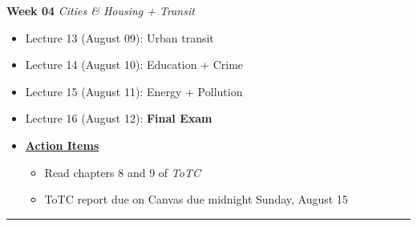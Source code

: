\documentclass[11pt]{article}
\begin{document}
		\textbf{Week 04} \textit{Cities \& Housing + Transit}
	\begin{itemize}
		\item Lecture 13 (August 09): Urban transit
		\item Lecture 14 (August 10): Education + Crime
		\item Lecture 15 (August 11): Energy + Pollution
		\item Lecture 16 (August 12): \textbf{Final Exam}
		\item[]\underline{\textbf{Action Items}}
		\begin{itemize}
				\item Read chapters 8 and 9 of \textit{ToTC}
				\item ToTC report due on Canvas due midnight Sunday, August 15
		\end{itemize}
	\end{itemize}
	\noindent\rule[0.5ex]{\linewidth}{1pt}
	
\end{document}
